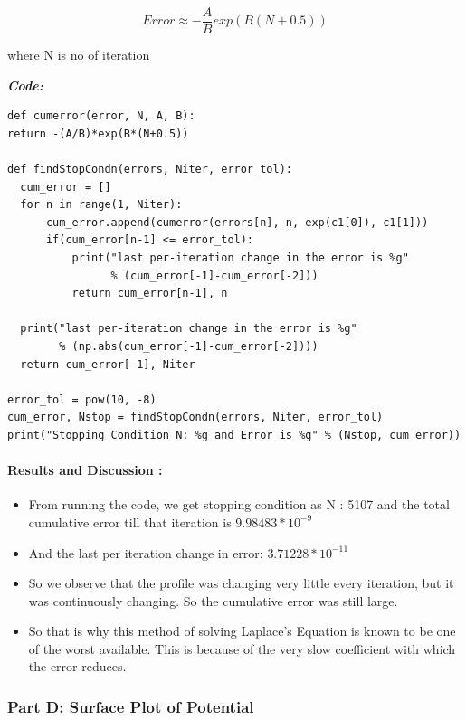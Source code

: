 \documentclass[11pt, a4paper]{article}
\begin{document}
\begin{equation}
    Error \approx -\frac{A}{B}exp(B(N+0.5))
    \end{equation}

where N is no of iteration

\textit{\textbf{Code:}}
\begin{lstlisting}
def cumerror(error, N, A, B):
return -(A/B)*exp(B*(N+0.5))

def findStopCondn(errors, Niter, error_tol):
  cum_error = []
  for n in range(1, Niter):
      cum_error.append(cumerror(errors[n], n, exp(c1[0]), c1[1]))
      if(cum_error[n-1] <= error_tol):
          print("last per-iteration change in the error is %g"
                % (cum_error[-1]-cum_error[-2]))
          return cum_error[n-1], n

  print("last per-iteration change in the error is %g"
        % (np.abs(cum_error[-1]-cum_error[-2])))
  return cum_error[-1], Niter

error_tol = pow(10, -8)
cum_error, Nstop = findStopCondn(errors, Niter, error_tol)
print("Stopping Condition N: %g and Error is %g" % (Nstop, cum_error))

\end{lstlisting}
\newpage
\paragraph{Results and Discussion :}\label{results-and-discussion}

\begin{itemize}
\item
  From running the code, we get stopping condition as N : 5107 and the total cumulative
  error till that iteration is \(9.98483*10^{-9}\)
\item
  And the last per iteration change in error: \(3.71228*10^{-11}\)
\item
  So we observe that the profile was changing very little every
  iteration, but it was continuously changing. So the cumulative error
  was still large.
\item
  So that is why this method of solving Laplace's Equation is known to
  be one of the worst available. This is because of the very slow
  coefficient with which the error reduces.
\end{itemize}
\subsubsection{Part D: Surface Plot of
Potential}\label{part-d-surface-plot-of-potential}
\end{document}
